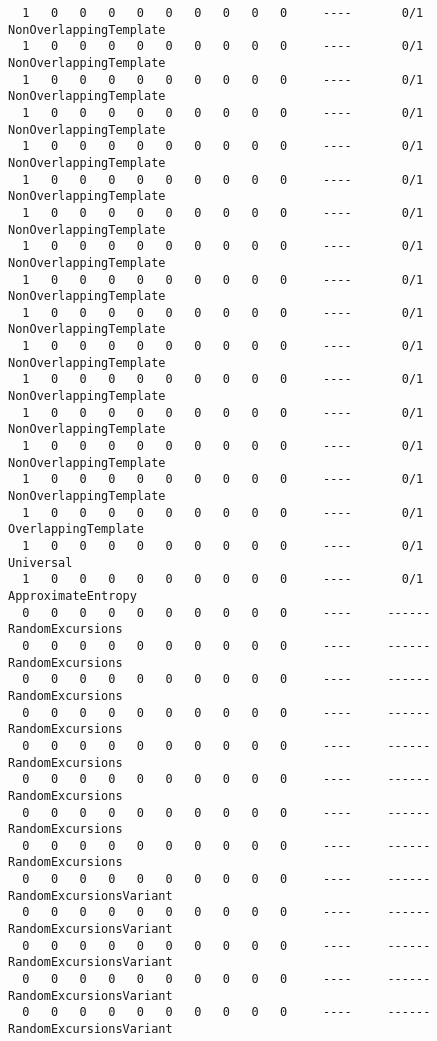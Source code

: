 \begin{code}
\begin{verbatim}
  1   0   0   0   0   0   0   0   0   0     ----       0/1       NonOverlappingTemplate
  1   0   0   0   0   0   0   0   0   0     ----       0/1       NonOverlappingTemplate
  1   0   0   0   0   0   0   0   0   0     ----       0/1       NonOverlappingTemplate
  1   0   0   0   0   0   0   0   0   0     ----       0/1       NonOverlappingTemplate
  1   0   0   0   0   0   0   0   0   0     ----       0/1       NonOverlappingTemplate
  1   0   0   0   0   0   0   0   0   0     ----       0/1       NonOverlappingTemplate
  1   0   0   0   0   0   0   0   0   0     ----       0/1       NonOverlappingTemplate
  1   0   0   0   0   0   0   0   0   0     ----       0/1       NonOverlappingTemplate
  1   0   0   0   0   0   0   0   0   0     ----       0/1       NonOverlappingTemplate
  1   0   0   0   0   0   0   0   0   0     ----       0/1       NonOverlappingTemplate
  1   0   0   0   0   0   0   0   0   0     ----       0/1       NonOverlappingTemplate
  1   0   0   0   0   0   0   0   0   0     ----       0/1       NonOverlappingTemplate
  1   0   0   0   0   0   0   0   0   0     ----       0/1       NonOverlappingTemplate
  1   0   0   0   0   0   0   0   0   0     ----       0/1       NonOverlappingTemplate
  1   0   0   0   0   0   0   0   0   0     ----       0/1       NonOverlappingTemplate
  1   0   0   0   0   0   0   0   0   0     ----       0/1       OverlappingTemplate
  1   0   0   0   0   0   0   0   0   0     ----       0/1       Universal
  1   0   0   0   0   0   0   0   0   0     ----       0/1       ApproximateEntropy
  0   0   0   0   0   0   0   0   0   0     ----     ------     RandomExcursions
  0   0   0   0   0   0   0   0   0   0     ----     ------     RandomExcursions
  0   0   0   0   0   0   0   0   0   0     ----     ------     RandomExcursions
  0   0   0   0   0   0   0   0   0   0     ----     ------     RandomExcursions
  0   0   0   0   0   0   0   0   0   0     ----     ------     RandomExcursions
  0   0   0   0   0   0   0   0   0   0     ----     ------     RandomExcursions
  0   0   0   0   0   0   0   0   0   0     ----     ------     RandomExcursions
  0   0   0   0   0   0   0   0   0   0     ----     ------     RandomExcursions
  0   0   0   0   0   0   0   0   0   0     ----     ------     RandomExcursionsVariant
  0   0   0   0   0   0   0   0   0   0     ----     ------     RandomExcursionsVariant
  0   0   0   0   0   0   0   0   0   0     ----     ------     RandomExcursionsVariant
  0   0   0   0   0   0   0   0   0   0     ----     ------     RandomExcursionsVariant
  0   0   0   0   0   0   0   0   0   0     ----     ------     RandomExcursionsVariant

\end{verbatim}
\end{code}
